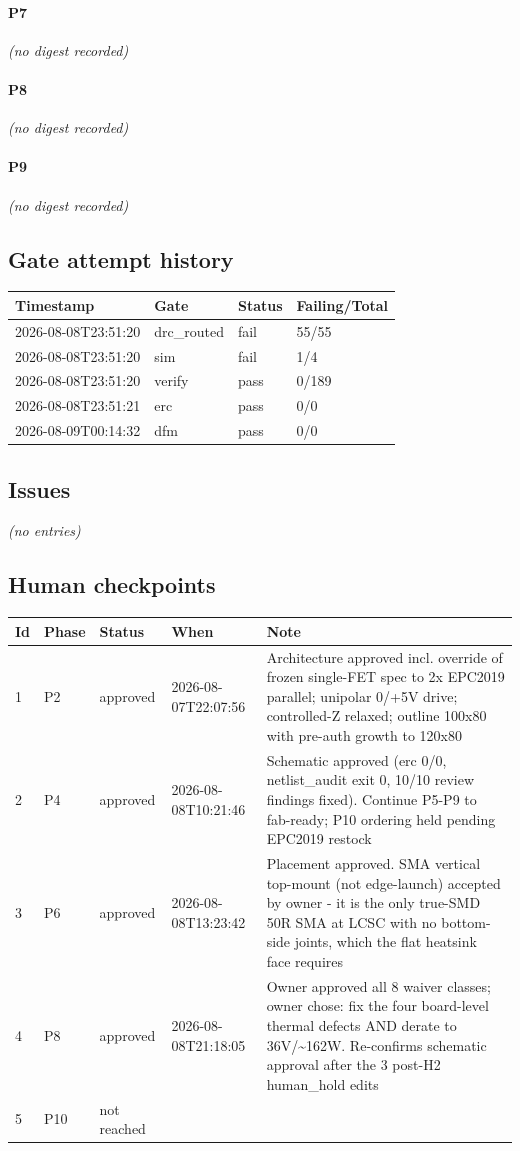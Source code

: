 \documentclass[11pt,a4paper]{article}
\begin{document}
\paragraph*{P7}
\emph{(no digest recorded)}
\paragraph*{P8}
\emph{(no digest recorded)}
\paragraph*{P9}
\emph{(no digest recorded)}
\subsection*{Gate attempt history}
{\small
\begin{longtable}{llll}
\toprule
\textbf{Timestamp} & \textbf{Gate} & \textbf{Status} & \textbf{Failing/Total} \\
\midrule
\endhead
2026-08-08T23:51:20 & drc\_routed & fail & 55/55 \\
2026-08-08T23:51:20 & sim & fail & 1/4 \\
2026-08-08T23:51:20 & verify & pass & 0/189 \\
2026-08-08T23:51:21 & erc & pass & 0/0 \\
2026-08-09T00:14:32 & dfm & pass & 0/0 \\
\bottomrule
\end{longtable}
}
\subsection*{Issues}
\emph{(no entries)}
\subsection*{Human checkpoints}
{\small
\begin{longtable}{lllp{2.6cm}p{6.4cm}}
\toprule
\textbf{Id} & \textbf{Phase} & \textbf{Status} & \textbf{When} & \textbf{Note} \\
\midrule
\endhead
1 & P2 & approved & 2026-08-07T22:07:56 & Architecture approved incl. override of frozen single-FET spec to 2x EPC2019 parallel; unipolar 0/+5V drive; controlled-Z relaxed; outline 100x80 with pre-auth growth to 120x80 \\
2 & P4 & approved & 2026-08-08T10:21:46 & Schematic approved (erc 0/0, netlist\_audit exit 0, 10/10 review findings fixed). Continue P5-P9 to fab-ready; P10 ordering held pending EPC2019 restock \\
3 & P6 & approved & 2026-08-08T13:23:42 & Placement approved. SMA vertical top-mount (not edge-launch) accepted by owner - it is the only true-SMD 50R SMA at LCSC with no bottom-side joints, which the flat heatsink face requires \\
4 & P8 & approved & 2026-08-08T21:18:05 & Owner approved all 8 waiver classes; owner chose: fix the four board-level thermal defects AND derate to 36V/\textasciitilde{}162W. Re-confirms schematic approval after the 3 post-H2 human\_hold edits \\
5 & P10 & not reached &  &  \\
\bottomrule
\end{longtable}
}
\end{document}

